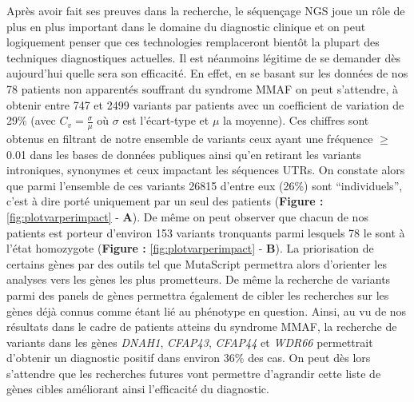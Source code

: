 \documentclass[12pt,a4paper,twoside]{ugathesis}
\theoremstyle{definition}
\theoremstyle{definition}
\theoremstyle{definition}
\theoremstyle{remark}
\begin{document}
Après avoir fait ses preuves dans la recherche, le séquençage NGS joue
un rôle de plus en plus important dans le domaine du diagnostic clinique
et on peut logiquement penser que ces technologies remplaceront bientôt
la plupart des techniques diagnostiques actuelles. Il est néanmoins
légitime de se demander dès aujourd'hui quelle sera son efficacité. En
effet, en se basant sur les données de nos 78 patients non apparentés
souffrant du syndrome MMAF on peut s'attendre, à obtenir entre 747 et
2499 variants par patients avec un coefficient de variation de 29\%
(avec \(C_v = \frac{\sigma}{\mu}\) où \(\sigma\) est l'écart-type et
\(\mu\) la moyenne). Ces chiffres sont obtenus en filtrant de notre
ensemble de variants ceux ayant une fréquence \(\ge\) 0.01 dans les
bases de données publiques ainsi qu'en retirant les variants
introniques, synonymes et ceux impactant les séquences UTRs. On constate
alors que parmi l'ensemble de ces variants 26815 d'entre eux (26\%) sont
``individuels'', c'est à dire porté uniquement par un seul des patients
(\textbf{Figure : }\ref{fig:plotvarperimpact} - \textbf{A}). De même on
peut observer que chacun de nos patients est porteur d'environ 153
variants tronquants parmi lesquels 78 le sont à l'état homozygote
(\textbf{Figure : }\ref{fig:plotvarperimpact} - \textbf{B}). La
priorisation de certains gènes par des outils tel que MutaScript
permettra alors d'orienter les analyses vers les gènes les plus
prometteurs. De même la recherche de variants parmi des panels de gènes
permettra également de cibler les recherches sur les gènes déjà connus
comme étant lié au phénotype en question. Ainsi, au vu de nos résultats
dans le cadre de patients atteins du syndrome MMAF, la recherche de
variants dans les gènes \emph{DNAH1}, \emph{CFAP43}, \emph{CFAP44} et
\emph{WDR66} permettrait d'obtenir un diagnostic positif dans environ
36\% des cas. On peut dès lors s'attendre que les recherches futures
vont permettre d'agrandir cette liste de gènes cibles améliorant ainsi
l'efficacité du diagnostic.

\newpage
\end{document}
